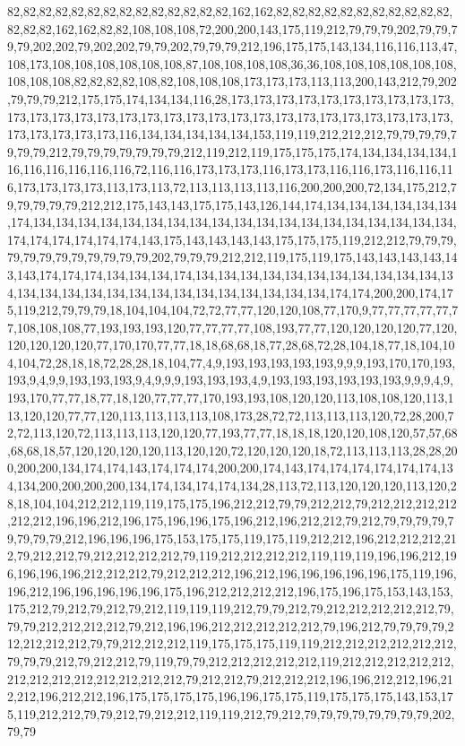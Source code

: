 82,82,82,82,82,82,82,82,82,82,82,82,82,82,162,162,82,82,82,82,82,82,82,82,82,82,82,82,82,82,162,162,82,82,108,108,108,72,200,200,143,175,119,212,79,79,79,202,79,79,79,79,202,202,79,202,202,79,79,202,79,79,79,212,196,175,175,143,134,116,116,113,47,108,173,108,108,108,108,108,108,87,108,108,108,108,36,36,108,108,108,108,108,108,108,108,108,82,82,82,82,108,82,108,108,108,173,173,173,113,113,200,143,212,79,202,79,79,79,212,175,175,174,134,134,116,28,173,173,173,173,173,173,173,173,173,173,173,173,173,173,173,173,173,173,173,173,173,173,173,173,173,173,173,173,173,173,173,173,173,173,173,116,134,134,134,134,134,153,119,119,212,212,212,79,79,79,79,79,79,79,212,79,79,79,79,79,79,79,212,119,212,119,175,175,175,174,134,134,134,134,116,116,116,116,116,116,72,116,116,173,173,173,116,173,173,116,116,173,116,116,116,173,173,173,173,113,173,113,72,113,113,113,113,116,200,200,200,72,134,175,212,79,79,79,79,79,212,212,175,143,143,175,175,143,126,144,174,134,134,134,134,134,134,174,134,134,134,134,134,134,134,134,134,134,134,134,134,134,134,134,134,134,134,174,174,174,174,174,174,143,175,143,143,143,143,175,175,175,119,212,212,79,79,79,79,79,79,79,79,79,79,79,79,202,79,79,79,212,212,119,175,119,175,143,143,143,143,143,143,174,174,174,134,134,134,174,134,134,134,134,134,134,134,134,134,134,134,134,134,134,134,134,134,134,134,134,134,134,134,134,134,134,174,174,200,200,174,175,119,212,79,79,79,18,104,104,104,72,72,77,77,120,120,108,77,170,9,77,77,77,77,77,77,108,108,108,77,193,193,193,120,77,77,77,77,108,193,77,77,120,120,120,120,77,120,120,120,120,120,77,170,170,77,77,18,18,68,68,18,77,28,68,72,28,104,18,77,18,104,104,104,72,28,18,18,72,28,28,18,104,77,4,9,193,193,193,193,193,9,9,9,193,170,170,193,193,9,4,9,9,193,193,193,9,4,9,9,9,193,193,193,4,9,193,193,193,193,193,193,9,9,9,4,9,193,170,77,77,18,77,18,120,77,77,77,170,193,193,108,120,120,113,108,108,120,113,113,120,120,77,77,120,113,113,113,113,108,173,28,72,72,113,113,113,120,72,28,200,72,72,113,120,72,113,113,113,120,120,77,193,77,77,18,18,18,120,120,108,120,57,57,68,68,68,18,57,120,120,120,120,113,120,120,72,120,120,120,18,72,113,113,113,28,28,200,200,200,134,174,174,143,174,174,174,200,200,174,143,174,174,174,174,174,174,134,134,200,200,200,200,134,174,134,174,174,134,28,113,72,113,120,120,120,113,120,28,18,104,104,212,212,119,119,175,175,196,212,212,79,79,212,212,79,212,212,212,212,212,212,196,196,212,196,175,196,196,175,196,212,196,212,212,79,212,79,79,79,79,79,79,79,79,212,196,196,196,175,153,175,175,119,175,119,212,212,196,212,212,212,212,79,212,212,79,212,212,212,212,79,119,212,212,212,212,119,119,119,196,196,212,196,196,196,196,212,212,212,79,212,212,212,196,212,196,196,196,196,196,175,119,196,196,212,196,196,196,196,196,175,196,212,212,212,212,196,175,196,175,153,143,153,175,212,79,212,79,212,79,212,119,119,119,212,79,79,212,79,212,212,212,212,212,79,79,79,212,212,212,212,79,212,196,196,212,212,212,212,212,79,196,212,79,79,79,79,212,212,212,212,79,79,212,212,212,119,175,175,175,119,119,212,212,212,212,212,212,79,79,79,212,79,212,212,79,119,79,79,212,212,212,212,212,119,212,212,212,212,212,212,212,212,212,212,212,212,212,79,212,212,79,212,212,212,196,196,212,212,196,212,212,196,212,212,196,175,175,175,175,196,196,175,175,119,175,175,175,143,153,175,119,212,212,79,79,212,79,212,212,119,119,212,79,212,79,79,79,79,79,79,79,79,202,79,79